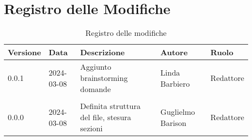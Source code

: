 \section{Registro delle Modifiche}
\begin{table}[ht!]	
		\centering
		\begin{tabular}{ p{1.2cm} p{2cm} p{6cm} p{3cm} p{2cm}}
			\toprule
			\textbf{Versione}& \textbf{Data} & \textbf{Descrizione} & \textbf{Autore} & \textbf{Ruolo} \\
			\midrule
			0.0.1 & 2024-03-08 & Aggiunto brainstorming domande & Linda Barbiero &
			Redattore \\\\ %
			0.0.0 & 2024-03-08 & Definita struttura del file, stesura sezioni & Guglielmo Barison & Redattore \\
			\bottomrule
		\end{tabular}
		\caption{Registro delle modifiche}
		\label{table:Registro delle modifiche}
\end{table}
